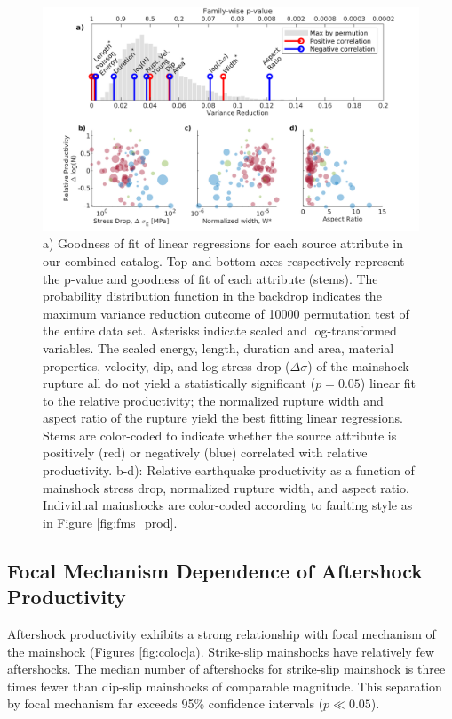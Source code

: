 \documentclass[draft, jgrga]{agujournal2018}
\begin{document}
    \begin{figure}
        \centering
        \includegraphics[width = \linewidth]{figures/stem_plot.png}
        \caption{a) Goodness of fit of linear regressions for each source attribute in our combined catalog. Top and bottom axes respectively represent the p-value and goodness of fit of each attribute (stems). The probability distribution function in the backdrop indicates the maximum variance reduction outcome of 10000 permutation test of the entire data set. Asterisks indicate scaled and log-transformed variables. The scaled energy, length, duration and area, material properties, velocity, dip, and log-stress drop ($\Delta\sigma$) of the mainshock rupture all do not yield a statistically significant ($p=0.05$) linear fit to the relative productivity; the normalized rupture width and aspect ratio of the rupture yield the best fitting linear regressions. Stems are color-coded to indicate whether the source attribute is positively (red) or negatively (blue) correlated with relative productivity. b-d): Relative earthquake productivity as a function of mainshock stress drop, normalized rupture width, and aspect ratio. Individual mainshocks are color-coded according to faulting style as in Figure \ref{fig:fms_prod}.}
        \label{fig:r2_finite_fault}
    \end{figure}
    
    \subsection{Focal Mechanism Dependence of Aftershock Productivity} 
    
    Aftershock productivity exhibits a strong relationship with focal mechanism of the mainshock (Figures \ref{fig:coloc}a). Strike-slip mainshocks have relatively few aftershocks. The median number of aftershocks for strike-slip mainshock is three times fewer than dip-slip mainshocks of comparable magnitude. This separation by focal mechanism far exceeds 95\% confidence intervals ($p\ll 0.05$). 
    
\end{document}
